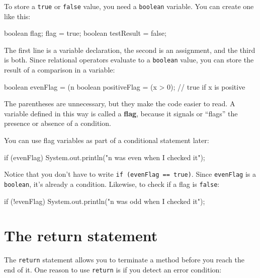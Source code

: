 \documentclass[12pt]{book}
\theoremstyle{exercise}
\newcommand{\java}[1]{\verb"#1"}
\begin{document}

To store a \java{true} or \java{false} value, you need a \java{boolean} variable.
You can create one like this:

\begin{code}
    boolean flag;
    flag = true;
    boolean testResult = false;
\end{code}


The first line is a variable declaration, the second is an assignment, and the third is both.
Since relational operators evaluate to a \java{boolean} value, you can store the result of a comparison in a variable:

\begin{code}
    boolean evenFlag = (n %
    boolean positiveFlag = (x > 0);     // true if x is positive
\end{code}

The parentheses are unnecessary, but they make the code easier to read.
A variable defined in this way is called a {\bf flag}, because it signals or ``flags'' the presence or absence of a condition.

You can use flag variables as part of a conditional statement later:

\begin{code}
    if (evenFlag) {
        System.out.println("n was even when I checked it");
    }
\end{code}

Notice that you don't have to write \java{if (evenFlag == true)}.
Since \java{evenFlag} is a \java{boolean}, it's already a condition.
Likewise, to check if a flag is \java{false}:

\begin{code}
    if (!evenFlag) {
        System.out.println("n was odd when I checked it");
    }
\end{code}


\section{The return statement}


The \java{return} statement allows you to terminate a method before you reach the end of it.
One reason to use \java{return} is if you detect an error condition:
\end{document}
